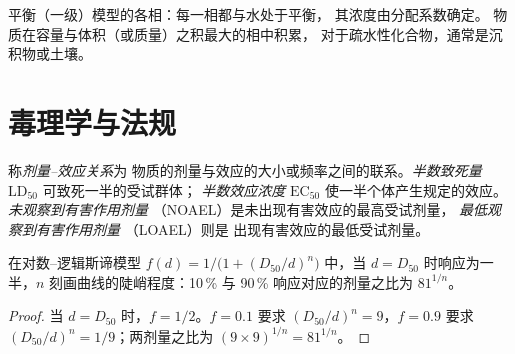 \begin{omfigure}

{\small 平衡（一级）模型的各相：每一相都与水处于平衡，
其浓度由分配系数确定。
物质在容量与体积（或质量）之积最大的相中积累，
对于疏水性化合物，通常是沉积物或土壤。}
\end{omfigure}

\section{毒理学与法规}

\begin{definition}[剂量–效应]\label{def:b3:environmental-toxicology:dose}
称\emph{剂量–效应关系}为
物质的剂量与效应的大小或频率之间的联系。\emph{半数致死量}
$\mathrm{LD_{50}}$ 可致死一半的受试群体；
\emph{半数效应浓度} $\mathrm{EC_{50}}$ 使一半个体产生规定的效应。
\emph{未观察到有害作用剂量}
（NOAEL）是未出现有害效应的最高受试剂量，
\emph{最低观察到有害作用剂量}
（LOAEL）则是
出现有害效应的最低受试剂量。
\end{definition}

\begin{proposition}[对数–逻辑斯谛模型]\label{prop:b3:environmental-toxicology:dose-response}
在对数–逻辑斯谛模型 $f(d) = 1/\bigl(1 + (D_{50}/d)^n\bigr)$ 中，当 $d = D_{50}$ 时响应为一半，$n$
刻画曲线的陡峭程度：10\,\% 与 90\,\% 响应对应的剂量之比为 $81^{1/n}$。
\end{proposition}

\begin{proof}
当 $d = D_{50}$ 时，$f = 1/2$。$f = 0.1$ 要求 $(D_{50}/d)^n = 9$，$f = 0.9$ 要求 $(D_{50}/d)^n = 1/9$；两剂量之比为
$(9 \times 9)^{1/n} = 81^{1/n}$。
\end{proof}

